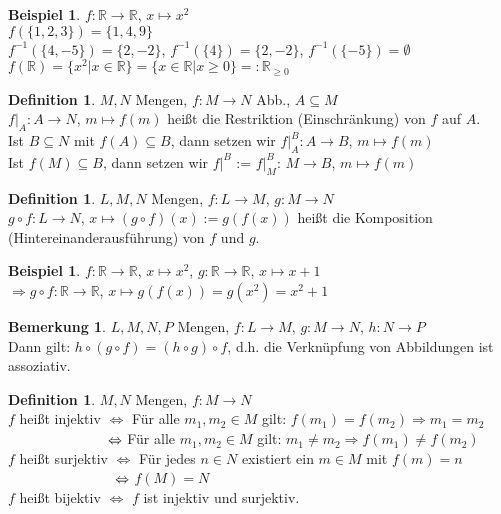 \documentclass[10pt,a4paper,numbers=endperiod]{scrartcl}
\theoremstyle{definition}
\newtheorem{defi}[satz]{Definition}
\newtheorem{bem}[satz]{Bemerkung}
\newtheorem{bsp}[satz]{Beispiel}
\begin{document}
\begin{bsp}
	$f: \mathbb{R} \rightarrow \mathbb{R}$, $x \mapsto x^{2}$\\
	$f(\{1,2,3\})=\{1,4,9\}$\\
	$f^{-1}(\{4,-5\})=\{2,-2\}$, $f^{-1}(\{4\})=\{2,-2\}$, 	$f^{-1}(\{-5\})=\emptyset$\\
	$f(\mathbb{R})= \{x^{2}|x \in \mathbb{R}\}=\{x \in \mathbb{R}| x \geq 0\} =: \mathbb{R}_{\geq 0}$
\end{bsp}

\begin{defi}
	$M,N$ Mengen, $f: M \rightarrow N$ Abb., $A \subseteq M$\\
	$f|_A: A \rightarrow N$, $m \mapsto f(m)$ heißt die Restriktion (Einschränkung) von $f$ auf $A$.\\
	Ist $B \subseteq N$ mit $f(A) \subseteq B$, dann setzen wir $f|^{B}_A: A \rightarrow B$, $m \mapsto f(m)$\\
	Ist $f(M) \subseteq B$, dann setzen wir $f|^{B}$ := $f|_M^{B}$: $M \rightarrow B$, $m \mapsto f(m)$
\end{defi}

\begin{defi}
	$L, M, N$ Mengen, $f: L \rightarrow M$, $g: M \rightarrow N$\\
	$g \circ f: L \rightarrow N$, $x \mapsto (g \circ f)(x):= g(f(x))$ heißt die Komposition (Hintereinanderausführung) von $f$ und $g$.
\end{defi}

\begin{bsp}
	$f: \mathbb{R} \rightarrow \mathbb{R}$, $x \mapsto x^{2}$, $g: \mathbb{R} \rightarrow \mathbb{R}$, $x \mapsto x+1$\\
	$\Rightarrow g\circ f: \mathbb{R} \rightarrow \mathbb{R}$, $x \mapsto g(f(x))= g(x^{2})= x^{2}+1$
\end{bsp}

\begin{bem}
	$L, M, N, P$ Mengen, $f: L \rightarrow M$, $g: M \rightarrow N$, $h: N \rightarrow P$\\
	Dann gilt: $h \circ (g \circ f) = (h \circ g) \circ f$, d.h. die Verknüpfung von Abbildungen ist assoziativ.
\end{bem}

\begin{defi}
	$M, N$ Mengen, $f:M \rightarrow N$\\
	$f$ heißt injektiv $\Leftrightarrow$ Für alle $m_1, m_2 \in M$ gilt: $f(m_1)=f(m_2) \Rightarrow m_1=m_2$\\
	$ \hspace*{24,9mm}\Leftrightarrow$ Für alle $m_1, m_2 \in M$ gilt: $m_1 \neq m_2 \Rightarrow f(m_1) \neq f(m_2)$\\
	$f$ heißt surjektiv $\Leftrightarrow$ Für jedes $n \in N$ existiert ein $m \in M$ mit $f(m)=n$\\
	$\hspace*{26,7mm} \Leftrightarrow$ $f(M) = N$\\
	$f$ heißt bijektiv $\Leftrightarrow$ $f$ ist injektiv und surjektiv.
\end{defi}
\end{document}

